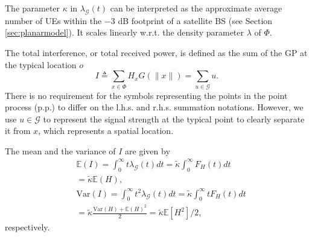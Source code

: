 \documentclass[lettersize,journal]{IEEEtran}
\begin{document}
The parameter $\kappa$ in $\lambda_{\mathcal{G}}(t)$ can be interpreted as the approximate average number of UEs within the $-3$ dB footprint of a satellite BS (see Section \ref{sec:planarmodel}). It scales linearly w.r.t. the density parameter $\lambda$ of $\Phi$.

The total interference, or total received power, is defined as the sum of the GP at the typical location $\textit{o}$ 
\begin{equation}
  \label{eq:totpow}
  I \triangleq \sum_{x \in \Phi} H_x G(\|x\|) = \sum_{u \in \mathcal{G}} u.
\end{equation}
There is no requirement for the symbols representing the points in the point process (p.p.) to differ on the l.h.s. and r.h.s. summation notations. However, we use $u \in \mathcal{G}$ to represent the signal strength at the typical point to clearly separate it from $x$, which represents a spatial location.




The mean and the variance of $I$ are given by
\begin{align}
  \label{eq:totmean}
  &\mathbb{E}\left(I \right) = \int_{0}^{\infty} t\lambda_{\mathcal{G}}(t) dt = \tilde{\kappa} \int_{0}^{\infty}F_H(t) dt \nonumber \\
  &=\tilde{\kappa} \mathbb{E}(H), \\\
  \label{eq:totvar}
  &\text{Var}\left(I \right) = \int_{0}^{\infty} t^2\lambda_{\mathcal{G}}(t) dt= \tilde{\kappa} \int_0^{\infty}tF_H(t) dt  \nonumber \\
  &= \tilde{\kappa} \frac{\text{Var}(H) + \mathbb{E}(H)^2}{2} = \tilde{\kappa}  \mathbb{E}[H^2]/2,
\end{align}
respectively.

\end{document}
